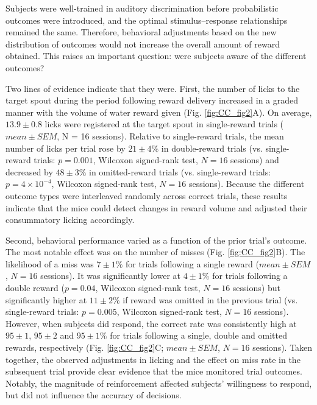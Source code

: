 Subjects were well-trained in auditory discrimination before probabilistic outcomes were introduced, and the optimal stimulus–response relationships remained the same. Therefore, behavioral adjustments based on the new distribution of outcomes would not increase the overall amount of reward obtained. This raises an important question: were subjects aware of the different outcomes? 

Two lines of evidence indicate that they were. First, the number of licks to the target spout during the period following reward delivery increased in a graded manner with the volume of water reward given (Fig. \ref{fig:CC_fig2}A). On average, $13.9 \pm 0.8$ licks were registered at the target spout in single-reward trials ($\mathit{mean}\pm\mathit{SEM}$, N = 16 sessions). Relative to single-reward trials, the mean number of licks per trial rose by $21 \pm 4\%$ in double-reward trials (vs. single-reward trials: $p = 0.001$, Wilcoxon signed-rank test, $N = 16$ sessions) and decreased by $48 \pm 3\%$ in omitted-reward trials (vs. single-reward trials: $p = 4 \times 10^{-4}$, Wilcoxon signed-rank test, $N = 16$ sessions). Because the different outcome types were interleaved randomly across correct trials, these results indicate that the mice could detect changes in reward volume and adjusted their consummatory licking accordingly.



Second, behavioral performance varied as a function of the prior trial’s outcome. The most notable effect was on the number of misses (Fig. \ref{fig:CC_fig2}B). The likelihood of a miss was $7 \pm 1\%$ for trials following a single reward ($\mathit{mean}\pm\mathit{SEM}$, $N = 16$ sessions). It was significantly lower at $4 \pm 1\%$ for trials following a double reward ($p = 0.04$, Wilcoxon signed-rank test, $N = 16$ sessions) but significantly higher at $11 \pm 2\%$ if reward was omitted in the previous trial (vs. single-reward trials: $p = 0.005$, Wilcoxon signed-rank test, $N = 16$ sessions). However, when subjects did respond, the correct rate was consistently high at $95 \pm 1$, $95 \pm 2$ and $95 \pm 1\%$ for trials following a single, double and omitted rewards, respectively (Fig. \ref{fig:CC_fig2}C; $\mathit{mean}\pm\mathit{SEM}$, $N = 16$ sessions). Taken together, the observed adjustments in licking and the effect on miss rate in the subsequent trial provide clear evidence that the mice monitored trial outcomes. Notably, the magnitude of reinforcement affected subjects’ willingness to respond, but did not influence the accuracy of decisions.

